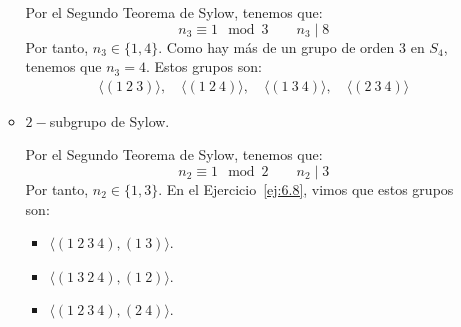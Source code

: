 \begin{ejercicio}
\begin{enumerate}
\begin{itemize}
            Por el Segundo Teorema de Sylow, tenemos que:
            \begin{equation*}
                n_3 \equiv 1 \mod 3 \qquad n_3 \mid 8
            \end{equation*}
            Por tanto, $n_3\in \{1,4\}$. Como hay más de un grupo de orden $3$ en $S_4$, tenemos que $n_3=4$. Estos grupos son:
            \begin{align*}
                \langle (1\ 2\ 3) \rangle, \quad \langle (1\ 2\ 4) \rangle, \quad \langle (1\ 3\ 4) \rangle, \quad \langle (2\ 3\ 4) \rangle
            \end{align*}

            \item $2-$subgrupo de Sylow.
            
            Por el Segundo Teorema de Sylow, tenemos que:
            \begin{equation*}
                n_2 \equiv 1 \mod 2 \qquad n_2 \mid 3
            \end{equation*}
            Por tanto, $n_2\in \{1,3\}$. En el Ejercicio~\ref{ej:6.8}, vimos que estos grupos son:
            \begin{itemize}
                \item $\langle (1\ 2\ 3\ 4), (1\ 3)\rangle$.
                \item $\langle (1\ 3\ 2\ 4), (1\ 2)\rangle$.
                \item $\langle (1\ 2\ 3\ 4), (2\ 4)\rangle$.
            \end{itemize}
            
        \end{itemize}
    \end{enumerate}
\end{ejercicio}

